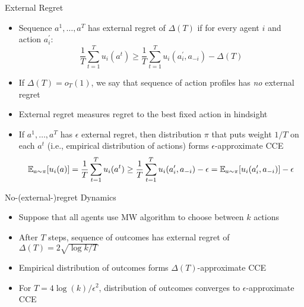 \documentclass[11pt,aspectratio=169]{beamer}
\begin{document}
  
  \begin{frame}{External Regret}
   \begin{itemize}[<+->]
    \item Sequence $a^1,\dots,a^T$ has \alert{external regret} of $\Delta(T)$ if for every agent $i$ and action $a_i^\prime$:
    $$\frac{1}{T}\sum_{t=1}^T u_i(a^t) \geq \frac{1}{T} \sum_{t=1}^T u_i(a_i^\prime,a_{-i}) - \Delta(T)$$
    \item If $\Delta(T) = o_T(1)$, we say that sequence of action profiles has \emph{no} external regret
    \item External regret measures regret to the best \alert{fixed} action in hindsight
    \item If $a^1,\dots,a^T$ has $\epsilon$ external regret, then distribution $\pi$ that puts weight $1/T$ on each $a^t$ (i.e., empirical distribution of actions) forms \alert{$\epsilon$-approximate CCE}
    $$\operatorname{\mathbb{E}}_{a\sim \pi}[u_i(a)] = \frac{1}{T}\sum_{t=1}^T u_i(a^t) \ge \frac{1}{T}\sum_{t=1}^T u_i(a_i^\prime,a_{-i}) - \epsilon = \operatorname{\mathbb{E}}_{a\sim \pi}[u_i(a_i^\prime, a_{-i})] - \epsilon$$
   \end{itemize}
  \end{frame}
  
  
  \begin{frame}{No-(external-)regret Dynamics}
   \begin{itemize}[<+->]
   \setlength{\itemsep}{1.5em}
    \item Suppose that all agents use MW algorithm to choose between $k$ actions
    \item After $T$ steps, sequence of outcomes has external regret of $\Delta(T) = 2\sqrt{\log k/T}$
    \item Empirical distribution of outcomes forms $\Delta(T)$-approximate CCE
    \item For $T = 4\log(k)/\epsilon^2$, distribution of outcomes converges to $\epsilon$-approximate CCE
   \end{itemize}
  \end{frame}
  
\end{document}

